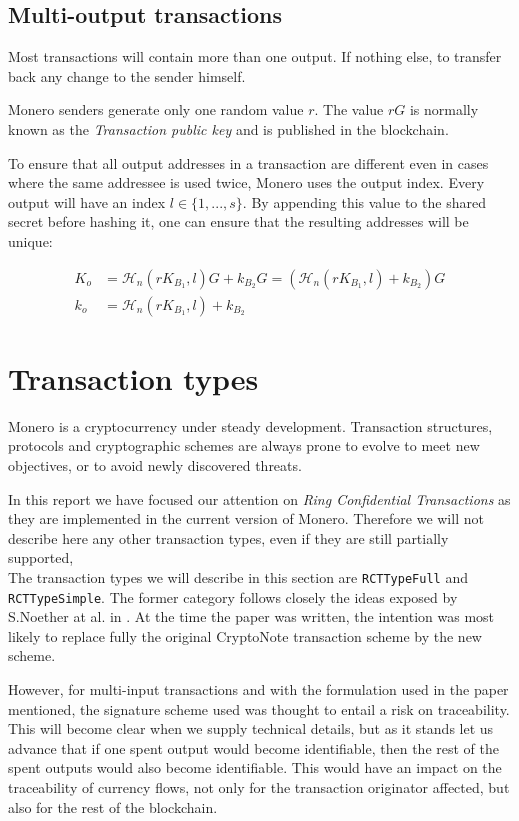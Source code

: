 \subsection{Multi-output transactions}

Most transactions will contain more than one output. 
If nothing else, to transfer back any change to the sender himself.

Monero senders generate only one random value \(r\). The value \(r G\) is normally known as the 
{\em Transaction public key} and is published in the blockchain.

To ensure that all output addresses in a transaction are different even in cases where the same addressee is
used twice, Monero uses the output index.
Every output will have an index \(l \in \{1, ..., s\}\). 
By appending this value to the shared secret before hashing it, one can ensure that the resulting
addresses will be unique:

\begin{align*}
  K_o &= \mathcal{H}_n (r K_{B_1}, l) G + k_{B_2} G = (\mathcal{H}_n (r K_{B_1}, l) + k_{B_2} ) G \\ 
  k_o &= \mathcal{H}_n (r K_{B_1}, l) + k_{B_2}
\end{align*} 

 



\section{Transaction types}

Monero is a cryptocurrency under steady development.
Transaction structures, protocols and cryptographic schemes are always prone to evolve
to meet new objectives, or to avoid newly discovered threats.

In this report we have focused our attention on {\em Ring Confidential Transactions} as they are implemented
in the current version of Monero. Therefore we will not describe here any other transaction types, even if
they are still partially supported,
\\

The transaction types we will describe in this section are {\tt RCTTypeFull} and {\tt RCTTypeSimple}.
The former category follows closely the ideas exposed by S.Noether at al. in \cite{ledger34}.
At the time the paper was written, the intention was most likely to replace fully the original CryptoNote
transaction scheme by the new scheme.

However, for multi-input transactions and with the formulation used in the paper mentioned,
the signature scheme used was thought to entail a risk on traceability. 
This will become clear when
we supply technical details, but as it stands let us advance that if one spent output would become
identifiable, then the rest of the spent outputs would also become identifiable.
This would have an impact on the traceability of currency flows, not only for the transaction originator
affected, but also for the rest of the blockchain.
\\

